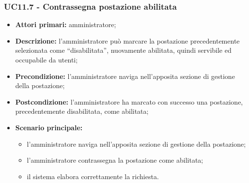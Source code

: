 \subsubsection{UC11.7 - Contrassegna postazione abilitata}

\begin{itemize}
\item \textbf{Attori primari:} amministratore;
\item \textbf{Descrizione:} l’amministratore può marcare la postazione precedentemente selezionata come “disabilitata”, nuovamente abilitata, quindi servibile ed occupabile da utenti;
\item \textbf{Precondizione:} l’amministratore naviga nell’apposita sezione di gestione della postazione; 
\item \textbf{Postcondizione:} l’amministratore ha marcato con successo una postazione, precedentemente disabilitata, come abilitata;
\item \textbf{Scenario principale:} 
	\begin{itemize}
		\item l’amministratore naviga nell’apposita sezione di gestione della postazione;
		\item l’amministratore contrassegna la postazione come abilitata;
		\item il sistema elabora correttamente la richiesta.
	\end{itemize}
\end{itemize}
